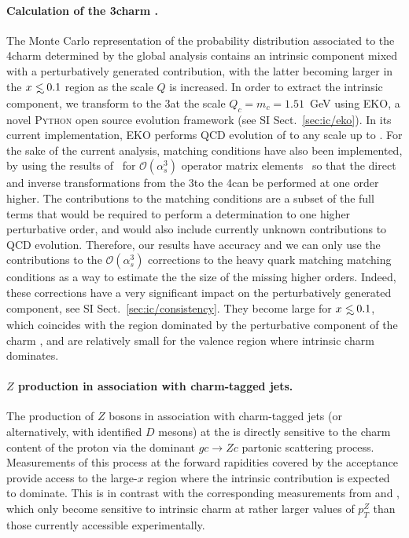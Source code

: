 \paragraph{Calculation of the 3\fns charm \pdf.}
%
The Monte Carlo representation of the probability distribution associated to
the 4\fns charm \pdf determined by the global
analysis contains an intrinsic component mixed with a perturbatively
generated contribution, with the latter
becoming larger in the $x\lsim 0.1$ region as the scale $Q$ is increased.
%
In order to extract the intrinsic component, 
we transform \pdfs to the 3\fns at the scale $Q_c=m_c=1.51$~GeV using
\textsc{\small EKO}, a novel \textsc{\small Python} open source
\pdf evolution framework (see  SI Sect.~\ref{sec:ic/eko}).
%
In its current implementation, \textsc{\small EKO} performs  QCD 
evolution of \pdfs to any scale
up to \nnlo. For
the sake of the current analysis, \nnnlo matching conditions have also
been implemented, by 
using  the results
of~\cite{Bierenbaum:2009zt,Bierenbaum:2009mv,Ablinger:2010ty,Ablinger:2014vwa,Ablinger:2014uka,Behring:2014eya,Ablinger_2014,Ablinger:2014nga,Blumlein:2017wxd}
for $\mathcal{O}(\alpha_s^3)$ operator matrix elements~
so that the direct and inverse transformations from the 3\fns to the
4\fns can be performed at one order
higher.
%
The \nnnlo contributions to the matching conditions are a subset of
the full \nnnlo terms that would be required to perform a \pdf determination
 to one higher perturbative order, and would
also include currently unknown
\nnnlo contributions to QCD evolution. Therefore, our results have 
\nnlo accuracy and we can only use the  \nnnlo contributions to the
 $\mathcal{O}(\alpha_s^3)$ corrections to the
heavy quark matching
matching conditions as a way to estimate the 
the size of the missing higher orders. 
Indeed, these corrections have a very 
significant impact on the
perturbatively generated component, see SI Sect.~\ref{sec:ic/consistency}.
%
They become large for $x \lsim 0.1$, which coincides with the region
dominated by the perturbative component of the charm \pdf,
  and are relatively small for the valence region
  where intrinsic charm dominates.
  
\paragraph{$Z$ production in association with charm-tagged jets.}
%
The production of $Z$ bosons in association with charm-tagged jets (or alternatively,
with identified $D$ mesons) at the \lhc is directly sensitive to the charm content
of the proton via the dominant $gc \to Zc$ partonic scattering process.
%
Measurements of this process at  the forward rapidities covered by the
\lhcb acceptance provide access to the large-$x$ region where the intrinsic 
contribution is expected to dominate.
%
This is in contrast with the corresponding measurements from \atlas and \cms,
which only become sensitive to intrinsic charm
at rather larger values of $p_T^Z$ than those
currently accessible experimentally.

